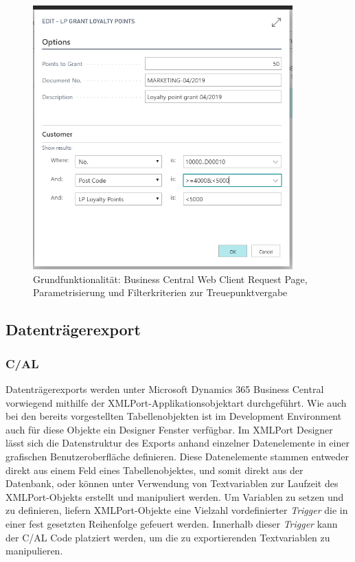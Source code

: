 \begin{figure}[h]
	\centering
	\includegraphics[width=100mm]{images/RequestPage}
	\caption{Grundfunktionalität: Business Central Web Client Request Page, Parametrisierung und Filterkriterien zur Treuepunktvergabe}
	\label{fig:Request Page}
\end{figure}

\subsection{Datenträgerexport}
\subsubsection{C/AL}
Datenträgerexports werden unter Microsoft Dynamics 365 Business Central vorwiegend mithilfe der XMLPort-Applikationsobjektart durchgeführt. Wie auch bei den bereits vorgestellten Tabellenobjekten ist im Development Environment auch für diese Objekte ein Designer Fenster verfügbar. Im XMLPort Designer lässt sich die Datenstruktur des Exports anhand einzelner Datenelemente in einer grafischen Benutzeroberfläche definieren. Diese Datenelemente stammen entweder direkt aus einem Feld eines Tabellenobjektes, und somit direkt aus der Datenbank, oder können unter Verwendung von Textvariablen zur Laufzeit des XMLPort-Objekts erstellt und manipuliert werden. Um Variablen zu setzen und zu definieren, liefern XMLPort-Objekte eine Vielzahl vordefinierter \textit{Trigger} die in einer fest gesetzten Reihenfolge gefeuert werden. Innerhalb dieser \textit{Trigger} kann der C/AL Code platziert werden, um die zu exportierenden Textvariablen zu manipulieren.

